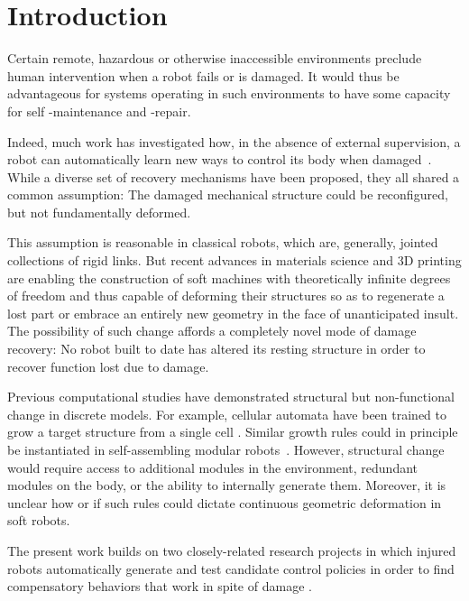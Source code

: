 \section{Introduction}
\label{sec:intro}


Certain remote, hazardous or otherwise inaccessible environments preclude human intervention when a robot fails or is damaged.
It would thus be advantageous for systems operating in such environments to have some capacity for self -maintenance and -repair.


Indeed, much work has investigated how,
in the absence of external supervision,
a robot can automatically learn new ways to control its body when damaged~\mbox{\cite{bongard2006resilient, chatzilygeroudis2018reset, cully2015robots, kano2017brittle, kwiatkowski2019task, mahdavi2003evolutionary, ren2015multiple}.}
While a diverse set of recovery mechanisms have been proposed, they all  
shared a common assumption: 
The damaged mechanical structure could be 
reconfigured, but not fundamentally deformed.


This assumption is reasonable in classical robots, which are, generally, jointed collections of rigid links.
But recent advances in materials science and 3D printing are enabling the construction of soft machines with theoretically infinite degrees of freedom and thus capable of deforming their
structures so as to regenerate a lost part or embrace an entirely new geometry in the face of unanticipated insult. 
The possibility of such change affords a completely novel mode of damage recovery:
No robot built to date has altered its resting structure in order to recover function lost due to damage.


Previous computational studies have demonstrated structural but non-functional change in discrete models.
For example, cellular automata have been trained to grow a target structure from a single cell \cite{eggenberger1997evolving, miller2004evolving}.
Similar growth rules could in principle be instantiated in self-assembling modular robots~\cite{white2005three,zykov2005robotics}.
However, structural change would require access to additional modules in the environment, redundant modules on the body, or the ability to internally generate them.
Moreover, it is unclear how or if such rules could dictate continuous geometric deformation in soft robots.

The present work builds on two closely-related research projects in which injured robots automatically generate and test candidate control policies in order to find compensatory behaviors that work in spite of damage
\cite{bongard2006resilient,cully2015robots}.



